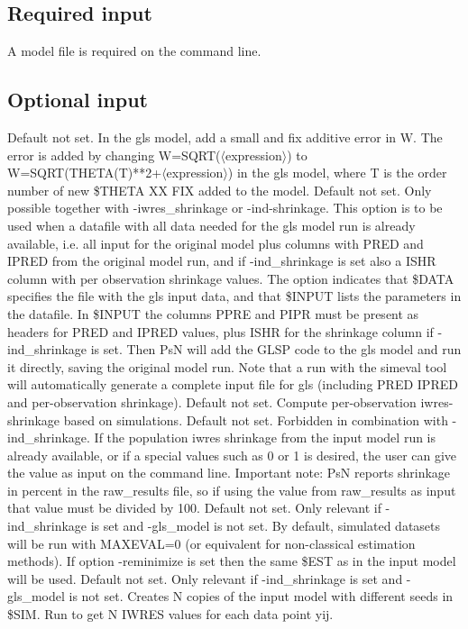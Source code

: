 \subsection{Required input}
A model file is required on the command line.


\subsection{Optional input}

\begin{optionlist}
Default not set. In the gls model, add a small and fix additive error in W. 
The error is added by changing W=SQRT($\langle$expression$\rangle$) to W=SQRT(THETA(T)**2+$\langle$expression$\rangle$) in the 
gls model, where T is the order number of new \$THETA XX FIX added to the model. 
\nextopt
{}
Default not set. Only possible together with -iwres\_shrinkage or -ind-shrinkage. This option is to be used when a datafile with all data needed for the gls model run is already available, i.e. all input for the original model plus columns with PRED and IPRED from the original model run, and if -ind\_shrinkage is set also a ISHR column with per observation shrinkage values. The option indicates that \$DATA specifies the file with the gls input data, and that \$INPUT lists the parameters in the datafile. In \$INPUT the columns PPRE and PIPR must be present as headers for PRED and IPRED values, plus ISHR for the shrinkage column if -ind\_shrinkage is set. 
Then PsN will add the GLSP code to the gls model and run it directly, saving the original model run.
Note that a run with the simeval tool will automatically generate a complete input file for gls (including PRED IPRED and per-observation shrinkage).
\nextopt
{}
Default not set. Compute per-observation iwres-shrinkage based on simulations. 
\nextopt
{}
Default not set. Forbidden in combination with -ind\_shrinkage. If the population iwres shrinkage from the input model run is already available, or if a special values such as 0 or 1 is desired, the user can give the value as input on the command line. Important note: PsN reports shrinkage
in percent in the raw\_results file, so if using the value from raw\_results as input that value must be divided by 100.   
\nextopt
{}
Default not set. Only relevant if -ind\_shrinkage is set and -gls\_model is not set. By default, simulated datasets will be run with MAXEVAL=0 
(or equivalent for non-classical estimation methods). If option -reminimize is set then the same \$EST as in the input model will be used. 
\nextopt
\newpage
{}
Default not set. Only relevant if -ind\_shrinkage is set and -gls\_model is not set. Creates N copies of the input model with different seeds in \$SIM. 
Run to get N IWRES values for each data point yij. 


\end{optionlist}
